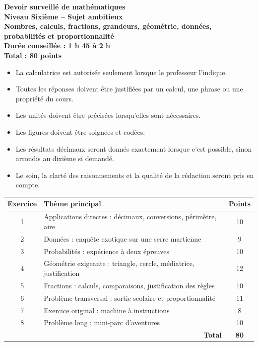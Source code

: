 \documentclass[11pt,a4paper]{article}
\begin{document}

\begin{center}
    {\Large \textbf{Devoir surveillé de mathématiques}}\\[0.2cm]
    {\large \textbf{Niveau Sixième -- Sujet ambitieux}}\\[0.2cm]
    {\large \textbf{Nombres, calculs, fractions, grandeurs, géométrie, données, probabilités et proportionnalité}}\\[0.4cm]
    \textbf{Durée conseillée : 1 h 45 à 2 h}\\[0.2cm]
    \textbf{Total : 80 points}
\end{center}

\begin{consignebox}
\begin{itemize}
    \item La calculatrice est autorisée seulement lorsque le professeur l'indique.
    \item Toutes les réponses doivent être justifiées par un calcul, une phrase ou une propriété du cours.
    \item Les unités doivent être précisées lorsqu'elles sont nécessaires.
    \item Les figures doivent être soignées et codées.
    \item Les résultats décimaux seront donnés exactement lorsque c'est possible, sinon arrondis au dixième si demandé.
    \item Le soin, la clarté des raisonnements et la qualité de la rédaction seront pris en compte.
\end{itemize}
\end{consignebox}

\vspace{0.3cm}

\begin{center}
\renewcommand{\arraystretch}{1.3}
\begin{tabularx}{0.95\textwidth}{|c|X|c|}
\hline
\textbf{Exercice} & \textbf{Thème principal} & \textbf{Points} \\
\hline
1 & Applications directes : décimaux, conversions, périmètre, aire & 10 \\
\hline
2 & Données : enquête exotique sur une serre martienne & 9 \\
\hline
3 & Probabilités : expérience à deux épreuves & 10 \\
\hline
4 & Géométrie exigeante : triangle, cercle, médiatrice, justification & 12 \\
\hline
5 & Fractions : calculs, comparaisons, justification des règles & 10 \\
\hline
6 & Problème transversal : sortie scolaire et proportionnalité & 11 \\
\hline
7 & Exercice original : machine à instructions & 8 \\
\hline
8 & Problème long : mini-parc d'aventures & 10 \\
\hline
\multicolumn{2}{|r|}{\textbf{Total}} & \textbf{80} \\
\hline
\end{tabularx}
\end{center}
\end{document}
